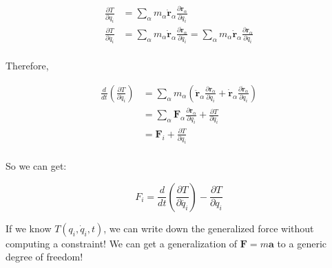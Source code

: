 \begin{align*}
    \frac {\partial T}{\partial q_i} &= \sum_\alpha m_\alpha \dot{\mathbf{r}}_\alpha \frac{\partial \dot{\mathbf{r}}_\alpha}{\partial q_i} \\
    \frac {\partial T}{\partial \dot{q_i}} &= \sum_\alpha m_\alpha \dot{\mathbf{r}}_\alpha \frac{\partial \dot{\mathbf{r}}_\alpha}{\partial \dot{q_i}} = \sum_\alpha m_\alpha \dot{\mathbf{r}}_\alpha \frac{\partial \mathbf{r}_\alpha}{\partial q_i}\\
\end{align*}

Therefore, 

\begin{align*}
    \frac{d}{dt} (\frac {\partial T}{\partial \dot{q_i}}) &= \sum_\alpha m_\alpha \left(\ddot{\mathbf{r}}_\alpha \frac{\partial \mathbf{r}_\alpha}{\partial q_i} + \dot{\mathbf{r}}_\alpha \frac{\partial \dot{\mathbf{r}}_\alpha}{\partial q_i}\right) \\
    &= \sum_\alpha \mathbf{F}_\alpha \frac{\partial \mathbf{r}_\alpha}{\partial q_i} + \frac{\partial T}{\partial q_i} \\
    &= \mathbf{F}_i + \frac{\partial T}{\partial q_i} \\
\end{align*}

So we can get:

\[
    F_i = \frac{d}{dt} (\frac {\partial T}{\partial \dot{q_i}}) - \frac{\partial T}{\partial q_i}
\]

If we know $T(q_i, \dot{q}_i, t)$, we can write down the generalized force without computing a constraint! We can get a generalization of $\mathbf{F}=m\mathbf{a}$ to a generic degree of freedom!